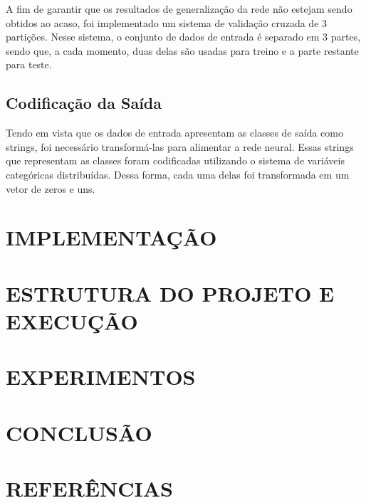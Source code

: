 \documentclass[12pt]{article}
\begin{document}
A fim de garantir que os resultados de generalização da rede não estejam
sendo obtidos ao acaso, foi implementado um sistema de validação cruzada
de 3 partições. Nesse sistema, o conjunto de dados de entrada é separado
em 3 partes, sendo que, a cada momento, duas delas são usadas para
treino e a parte restante para teste.

\subsection{Codificação da Saída}

Tendo em vista que os dados de entrada apresentam as classes de saída
como strings, foi necessário transformá-las para alimentar a rede neural.
Essas strings que representam as classes foram codificadas utilizando
o sistema de variáveis categóricas distribuídas. Dessa forma, cada uma
delas foi transformada em um vetor de zeros e uns.

\section{IMPLEMENTAÇÃO}



\section{ESTRUTURA DO PROJETO E EXECUÇÃO}



\section{EXPERIMENTOS} \label{sec:exp}



\section{CONCLUSÃO}



\section{REFERÊNCIAS}



\end{document}
